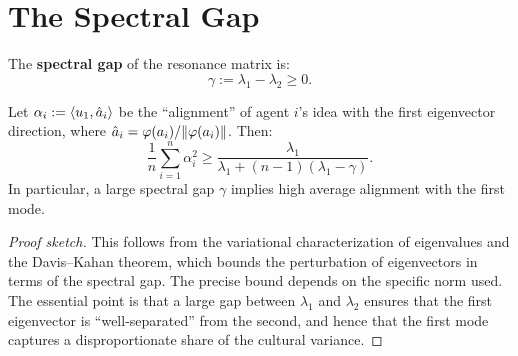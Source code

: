 \section{The Spectral Gap}

\begin{definition}
\label{def:spectral-gap}
The \textbf{spectral gap} of the resonance matrix is:
\[
  \gamma := \lambda_1 - \lambda_2 \geq 0.
\]
\end{definition}

\begin{theorem}
\label{thm:spectral-gap}
Let $\alpha_i := \langle u_1, \hat{a}_i \rangle$ be the ``alignment'' of agent $i$'s
idea with the first eigenvector direction, where $\hat{a}_i =
\varphi(a_i)/\lVert \varphi(a_i) \rVert$. Then:
\[
  \frac{1}{n}\sum_{i=1}^n \alpha_i^2 \geq \frac{\lambda_1}{\lambda_1 +
  (n-1)(\lambda_1 - \gamma)}.
\]
In particular, a large spectral gap $\gamma$ implies high average alignment
with the first mode.
\end{theorem}

\begin{proof}[Proof sketch]
This follows from the variational characterization of eigenvalues and the
Davis--Kahan theorem, which bounds the perturbation of eigenvectors in terms
of the spectral gap. The precise bound depends on the specific norm used.
The essential point is that a large gap between $\lambda_1$ and $\lambda_2$
ensures that the first eigenvector is ``well-separated'' from the second, and
hence that the first mode captures a disproportionate share of the cultural
variance.
\end{proof}

